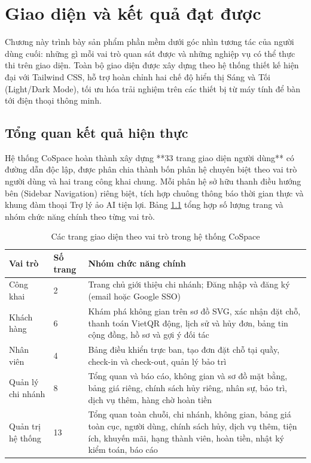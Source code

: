 \chapter{Giao diện và kết quả đạt được}
\label{ch:giaodien}

Chương này trình bày sản phẩm phần mềm dưới góc nhìn tương tác của người dùng cuối: những gì mỗi vai trò quan sát được và những nghiệp vụ có thể thực thi trên giao diện. Toàn bộ giao diện được xây dựng theo hệ thống thiết kế hiện đại với Tailwind CSS, hỗ trợ hoàn chỉnh hai chế độ hiển thị Sáng và Tối (Light/Dark Mode), tối ưu hóa trải nghiệm trên các thiết bị từ máy tính để bàn tới điện thoại thông minh.

\section{Tổng quan kết quả hiện thực}
\label{sec:gd_tongquan}

Hệ thống CoSpace hoàn thành xây dựng **33 trang giao diện người dùng** có đường dẫn độc lập, được phân chia thành bốn phân hệ chuyên biệt theo vai trò người dùng và hai trang công khai chung. Mỗi phân hệ sở hữu thanh điều hướng bên (Sidebar Navigation) riêng biệt, tích hợp chuông thông báo thời gian thực và khung đàm thoại Trợ lý ảo AI tiện lợi. Bảng \ref{tab:gd_thongke} tổng hợp số lượng trang và nhóm chức năng chính theo từng vai trò.

\begin{table}[H]
\centering
\caption{Các trang giao diện theo vai trò trong hệ thống CoSpace}
\label{tab:gd_thongke}
\small
\renewcommand{\arraystretch}{1.25}
\begin{tabular}{|p{3.0cm}|p{1.6cm}|p{9.2cm}|}
\hline
\textbf{Vai trò} & \textbf{Số trang} & \textbf{Nhóm chức năng chính} \\
\hline
Công khai & 2 & Trang chủ giới thiệu chi nhánh; Đăng nhập và đăng ký (email hoặc Google SSO) \\
\hline
Khách hàng & 6 & Khám phá không gian trên sơ đồ SVG, xác nhận đặt chỗ, thanh toán VietQR động, lịch sử và hủy đơn, bảng tin cộng đồng, hồ sơ và gợi ý đối tác \\
\hline
Nhân viên & 4 & Bảng điều khiển trực ban, tạo đơn đặt chỗ tại quầy, check-in và check-out, quản lý bảo trì \\
\hline
Quản lý chi nhánh & 8 & Tổng quan và báo cáo, không gian và sơ đồ mặt bằng, bảng giá riêng, chính sách hủy riêng, nhân sự, bảo trì, dịch vụ thêm, hàng chờ hoàn tiền \\
\hline
Quản trị hệ thống & 13 & Tổng quan toàn chuỗi, chi nhánh, không gian, bảng giá toàn cục, người dùng, chính sách hủy, dịch vụ thêm, tiện ích, khuyến mãi, hạng thành viên, hoàn tiền, nhật ký kiểm toán, báo cáo \\
\hline
\end{tabular}
\end{table}

